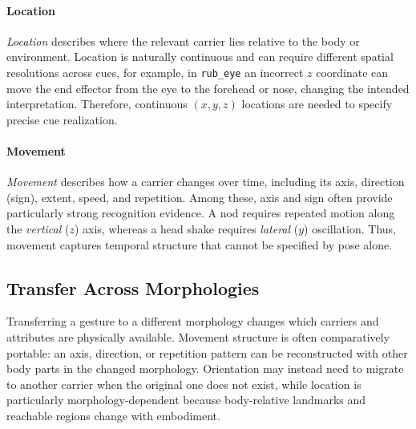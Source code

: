 \documentclass[letterpaper,10pt,conference]{ieeeconf}
\begin{document}
\paragraph{Location}
\textit{Location} describes where the relevant carrier lies relative to the body or environment. Location is naturally continuous and can require different spatial resolutions across cues, for example, in \texttt{rub\_eye} an incorrect $z$ coordinate can move the end effector from the eye to the forehead or nose, changing the intended interpretation. Therefore, continuous $(x,y,z)$ locations are needed to specify precise cue realization.

\paragraph{Movement}
\textit{Movement} describes how a carrier changes over time, including its axis, direction (sign), extent, speed, and repetition. Among these, axis and sign often provide particularly strong recognition evidence. A nod requires repeated motion along the \textit{vertical} ($z$) axis, whereas a head shake requires \textit{lateral} ($y$) oscillation. Thus, movement captures temporal structure that cannot be specified by pose alone.

\subsection{Transfer Across Morphologies}
\label{sec3.3}
Transferring a gesture to a different morphology changes which carriers and attributes are physically available. Movement structure is often comparatively portable: an axis, direction, or repetition pattern can be reconstructed with other body parts in the changed morphology. Orientation may instead need to migrate to another carrier when the original one does not exist, while location is particularly morphology-dependent because body-relative landmarks and reachable regions change with embodiment.
\end{document}
